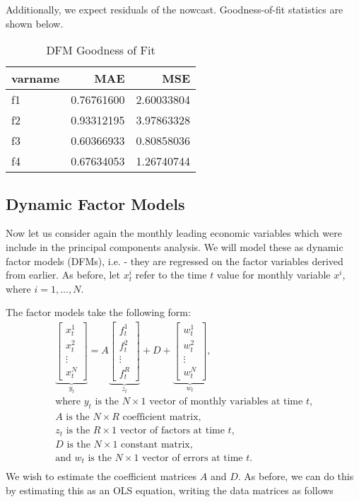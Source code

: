 \documentclass[11pt, letterpaper]{article}\usepackage[]{graphicx}\usepackage[]{color}
\begin{document}
Additionally, we expect residuals of the nowcast. Goodness-of-fit statistics are shown below.
\begin{table}[H]
\centering
\begingroup\footnotesize
\begin{tabular}{lrr}
  \hline
varname & MAE & MSE \\ 
  \hline
f1 & 0.76761600 & 2.60033804 \\ 
  f2 & 0.93312195 & 3.97863328 \\ 
  f3 & 0.60366933 & 0.80858036 \\ 
  f4 & 0.67634053 & 1.26740744 \\ 
   \hline
\end{tabular}
\endgroup
\caption{DFM Goodness of Fit} 
\end{table}




\subsection{Dynamic Factor Models}
Now let us consider again the monthly leading economic variables which were include in the principal components analysis. We will model these as dynamic factor models (DFMs), i.e. - they are regressed on the factor variables derived from earlier. As before, let $x^i_t$ refer to the time $t$ value for monthly variable $x^i$, where $i = 1, \dots, N$.

The factor models take the following form:
\begin{align*}
\underbrace{\begin{bmatrix}
	x^1_t\\
	x^2_t\\
	\vdots \\
	x^N_t
\end{bmatrix}}_{y_t}
=
A
\underbrace{\begin{bmatrix}
	f^1_{t}\\
	f^2_{t}\\
	\vdots \\
	f^R_{t}
\end{bmatrix}}_{z_t}
+
D 
+
\underbrace{\begin{bmatrix}
	w^1_t\\
	w^2_t\\
	\vdots\\
	w^N_t
\end{bmatrix}}_{w_t},\\
\text{where $y_t$ is the $N \times 1$ vector of monthly variables at time $t$,}\\
\text{$A$ is the $N \times R$ coefficient matrix,}\\
\text{$z_t$ is the $R \times 1$ vector of factors at time $t$,}\\
\text{$D$ is the $N \times 1$ constant matrix,}\\
\text{and $w_t$ is the $N \times 1$ vector of errors at time $t$.}\\
\end{align*}
We wish to estimate the coefficient matrices $A$ and $D$. As before, we can do this by estimating this as an OLS equation, writing the data matrices as follows
\end{document}
